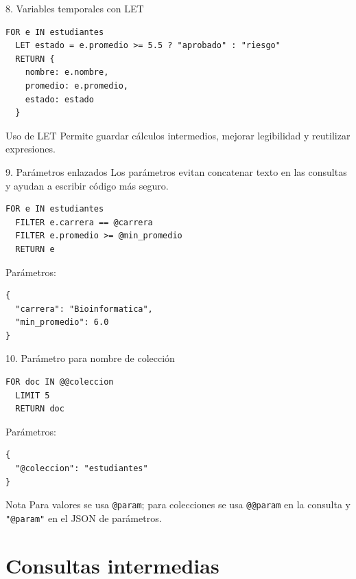 \documentclass[aspectratio=169,11pt]{beamer}
\begin{document}
\begin{frame}[fragile]{8. Variables temporales con LET}
\begin{lstlisting}
FOR e IN estudiantes
  LET estado = e.promedio >= 5.5 ? "aprobado" : "riesgo"
  RETURN {
    nombre: e.nombre,
    promedio: e.promedio,
    estado: estado
  }
\end{lstlisting}

\vspace{0.2cm}
\begin{block}{Uso de LET}
Permite guardar cálculos intermedios, mejorar legibilidad y reutilizar expresiones.
\end{block}
\end{frame}

\begin{frame}[fragile]{9. Parámetros enlazados}
Los parámetros evitan concatenar texto en las consultas y ayudan a escribir código más seguro.

\begin{lstlisting}
FOR e IN estudiantes
  FILTER e.carrera == @carrera
  FILTER e.promedio >= @min_promedio
  RETURN e
\end{lstlisting}

Parámetros:
\begin{lstlisting}
{
  "carrera": "Bioinformatica",
  "min_promedio": 6.0
}
\end{lstlisting}
\end{frame}

\begin{frame}[fragile]{10. Parámetro para nombre de colección}
\begin{lstlisting}
FOR doc IN @@coleccion
  LIMIT 5
  RETURN doc
\end{lstlisting}

Parámetros:
\begin{lstlisting}
{
  "@coleccion": "estudiantes"
}
\end{lstlisting}

\begin{alertblock}{Nota}
Para valores se usa \texttt{@param}; para colecciones se usa \texttt{@@param} en la consulta y \texttt{"@param"} en el JSON de parámetros.
\end{alertblock}
\end{frame}

\section{Consultas intermedias}
\end{document}
